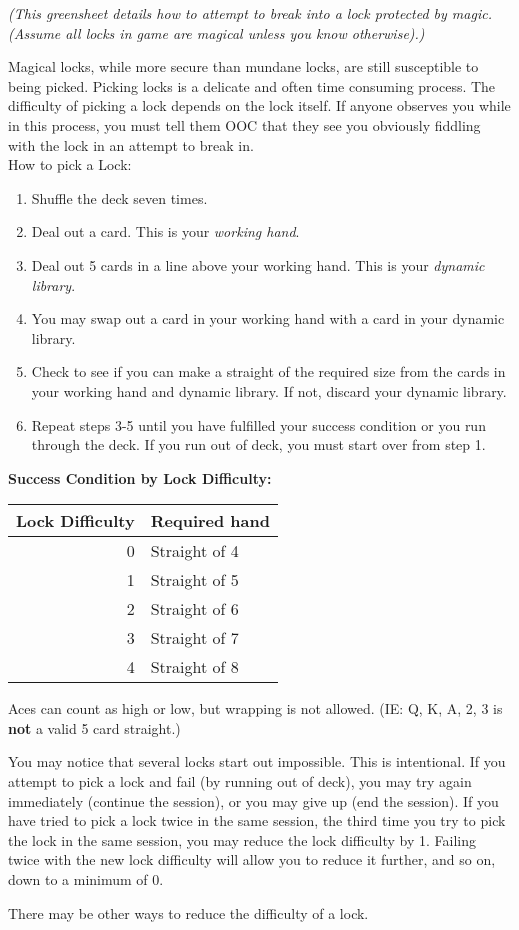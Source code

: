 \documentclass[green]{NeptuneBall}
\begin{document}
\name{\gDecking{}}

\emph{(This greensheet details how to attempt to break into a lock protected by magic. (Assume all locks in game are magical unless you know otherwise).)}

Magical locks, while more secure than mundane locks, are still susceptible to being picked. Picking locks is a delicate and often time consuming process. The difficulty of picking a lock depends on the lock itself. If anyone observes you while in this process, you must tell them OOC that they see you obviously fiddling with the lock in an attempt to break in.\\

How to pick a Lock:
\begin{enumerate}
	\item Shuffle the deck seven times.
	\item Deal out a card. This is your {\em working hand}.
	\item Deal out 5 cards in a line above your working hand. This is your {\em dynamic library}.
	\item You may swap out a card in your working hand with a card in your dynamic library.
	\item Check to see if you can make a straight of the required size from the cards in your working hand and dynamic library. If not, discard your dynamic library.
	\item Repeat steps 3-5 until you have fulfilled your success condition or you run through the deck.  If you run out of deck, you must start over from step 1.
\end{enumerate}

{\bf Success Condition by Lock Difficulty:}\\
\begin{tabular}{||r|l||}
\hline\hline
Lock Difficulty	& Required hand\\
\hline
0	& Straight of 4\\
1	& Straight of 5\\
2	& Straight of 6\\
3	& Straight of 7\\
4	& Straight of 8\\
\hline\hline 
\end{tabular}

\vspace{10 mm}

Aces can count as high or low, but wrapping is not allowed. (IE: Q, K, A, 2, 3 is {\bf not} a valid 5 card straight.)

You may notice that several locks start out impossible. This is intentional. If you attempt to pick a lock and fail (by running out of deck), you may try again immediately (continue the session), or you may give up (end the session). If you have tried to pick a lock twice in the same session, the third time you try to pick the lock in the same session, you may reduce the lock difficulty by 1. Failing twice with the new lock difficulty will allow you to reduce it further, and so on, down to a minimum of 0.

There may be other ways to reduce the difficulty of a lock.
\end{document}
